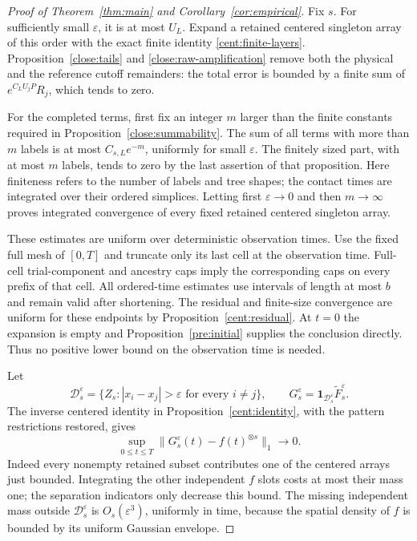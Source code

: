 \begin{proof}[Proof of Theorem~\ref{thm:main} and Corollary~\ref{cor:empirical}]
Fix $s$. For sufficiently small $\varepsilon$, it is at most
$U_L$. Expand a retained centered singleton array of this order
with the exact finite identity \eqref{cent:finite-layers}.
Proposition~\ref{close:tails} and
\eqref{close:raw-amplification} remove both the physical and
the reference cutoff remainders:
the total error is bounded by a finite sum of
$e^{C_LU_jP}R_j$, which tends to zero.

For the completed terms, first fix an integer $m$ larger than
the finite constants required in
Proposition~\ref{close:summability}. The sum of all terms with
more than $m$ labels is at most $C_{s,L}e^{-m}$, uniformly for
small $\varepsilon$. The finitely sized part, with at most $m$
labels, tends to zero by the last assertion of that proposition.
Here finiteness refers to the number of labels and tree shapes;
the contact times are integrated over their ordered simplices.
Letting first $\varepsilon\to0$ and then $m\to\infty$ proves
integrated convergence of every fixed retained centered
singleton array.

These estimates are uniform over deterministic observation
times. Use the fixed full mesh of $[0,T]$ and truncate only its
last cell at the observation time. Full-cell trial-component
and ancestry caps imply the corresponding caps on every prefix
of that cell. All ordered-time estimates use intervals of
length at most $b$ and remain valid after shortening. The
residual and finite-size convergence are uniform for these
endpoints by Proposition~\ref{cent:residual}. At $t=0$ the
expansion is empty and Proposition~\ref{pre:initial} supplies
the conclusion directly. Thus no positive lower bound on the
observation time is needed.

Let
\[
 \mathcal D_s^\varepsilon=
 \{Z_s:|x_i-x_j|>\varepsilon\text{ for every }i\ne j\},
 \qquad
 G_s^\varepsilon=
 \mathbf1_{\mathcal D_s^\varepsilon}
       \widetilde F_s^\varepsilon.
\]
The inverse centered identity in
Proposition~\ref{cent:identity}, with the pattern restrictions
restored, gives
\begin{equation}\label{close:isolated-limit}
 \sup_{0\leq t\leq T}
 \|G_s^\varepsilon(t)-f(t)^{\otimes s}\|_1\longrightarrow0.
\end{equation}
Indeed every nonempty retained subset contributes one of the
centered arrays just bounded. Integrating the other independent
$f$ slots costs at most their mass one; the separation indicators
only decrease this bound. The missing independent mass outside
$\mathcal D_s^\varepsilon$ is $O_s(\varepsilon^3)$, uniformly
in time, because the spatial density of $f$ is bounded by its
uniform Gaussian envelope.


\end{proof}
